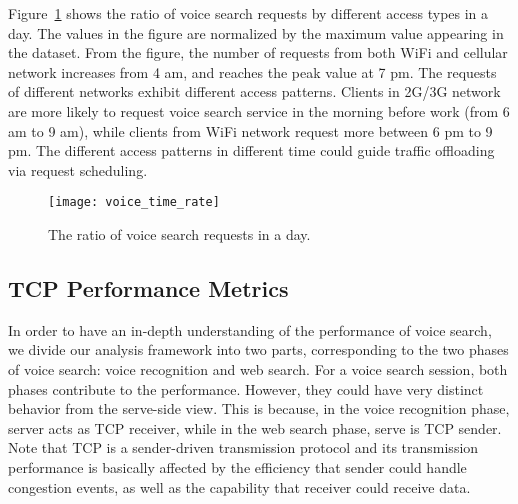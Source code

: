 Figure~\ref{fig:voice_time_rate} shows the ratio of voice search requests by different access types in a day. The values in the figure are normalized by the maximum value appearing in the dataset. From the figure, the number of requests from both WiFi and cellular network increases from 4 am, and reaches the peak value at 7 pm. The requests of different networks exhibit different access patterns. Clients in 2G/3G network are more likely to request voice search service in the morning before work (from 6 am to 9 am), while clients from WiFi network request more between 6 pm to 9 pm. The different access patterns in different time could guide traffic offloading via request scheduling. 

\begin{figure}[th]
\centering
\texttt{[image: voice\_time\_rate]}
\caption{The ratio of voice search requests in a day.}
\label{fig:voice_time_rate}
\end{figure}



\subsection{TCP Performance Metrics}

In order to have an in-depth understanding of the performance of voice search, we divide our analysis framework into two parts, corresponding to the two phases of voice search: voice recognition and web search. For a voice search session, both phases contribute to the performance. However, they could have very distinct behavior from the serve-side view. This is because, in the voice recognition phase, server acts as TCP receiver, while in the web search phase, serve is TCP sender. Note that TCP is a sender-driven transmission protocol and its transmission performance is basically affected by the efficiency that sender could handle congestion events, as well as the capability that receiver could receive data.

